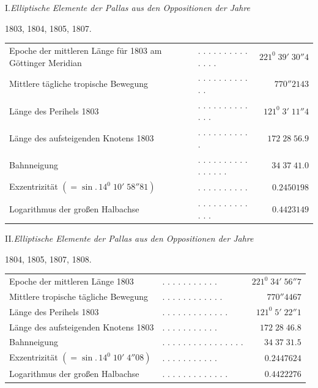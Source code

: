 \begin{center}I.\quad\textit{Elliptische Elemente der Pallas aus den Oppositionen der Jahre}\par
1803, 1804, 1805, 1807.\end{center}
\begingroup\small\setlength{\tabcolsep}{2pt}
\noindent\begin{tabular}{@{}p{.51\linewidth}lr@{}}
Epoche der mittleren Länge für 1803 am Göttinger Meridian&. . . . . . . . . . . . . .&$221^0\;39'\;30''4$\\
Mittlere tägliche tropische Bewegung&. . . . . . . . . . . .&$770''2143$\\
Länge des Perihels 1803&. . . . . . . . . . . . .&$121^0\;3'\;11''4$\\
Länge des aufsteigenden Knotens 1803&. . . . . . . . . . .&$172\;28\;56.9$\\
Bahnneigung&. . . . . . . . . . . . . . . .&$34\;37\;41.0$\\
Exzentrizität $(=\sin.\,14^0\;10'\;58''81)$&. . . . . . . . . .&$0.2450198$\\
Logarithmus der großen Halbachse&. . . . . . . . . . . . .&$0.4423149$
\end{tabular}\par\endgroup

\begin{center}II.\quad\textit{Elliptische Elemente der Pallas aus den Oppositionen der Jahre}\par
1804, 1805, 1807, 1808.\end{center}
\begingroup\small\setlength{\tabcolsep}{2pt}
\noindent\begin{tabular}{@{}p{.51\linewidth}lr@{}}
Epoche der mittleren Länge 1803&. . . . . . . . . . .&$221^0\;34'\;56''7$\\
Mittlere tropische tägliche Bewegung&. . . . . . . . . . . .&$770''4467$\\
Länge des Perihels 1803&. . . . . . . . . . . . .&$121^0\;5'\;22''1$\\
Länge des aufsteigenden Knotens 1803&. . . . . . . . . . .&$172\;28\;46.8$\\
Bahnneigung&. . . . . . . . . . . . . . . .&$34\;37\;31.5$\\
Exzentrizität $(=\sin.\,14^0\;10'\;4''08)$&. . . . . . . . . . .&$0.2447624$\\
Logarithmus der großen Halbachse&. . . . . . . . . . . . .&$0.4422276$
\end{tabular}\par\endgroup

